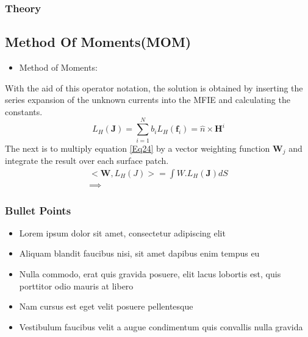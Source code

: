 \documentclass{beamer}
\begin{document}
\begin{frame}
\frametitle{Theory}
\subsection{Method Of Moments(MOM)}
\begin{itemize}
\item Method of Moments:
\end{itemize}
With the aid of this operator notation, the solution is obtained by inserting  the series expansion of the unknown currents into the MFIE and calculating the constants.
\begin{equation}
L_H(\textbf{J}) = \sum_{i=1}^N b_i L_H (\textbf{f}_i) = \hat{n}\times \textbf{H}^i
\label{Eq24}
\end{equation}
The next is to multiply equation \ref{Eq24} by a vector weighting function $\textbf{W}_j$ and integrate the result over each surface patch. 
\begin{eqnarray}
<\textbf{W}, L_H(J)> = \int W.L_H(\textbf{J})dS \\
\implies 
\end{eqnarray}
\end{frame}

\begin{frame}
\frametitle{Bullet Points}
\begin{itemize}
\item Lorem ipsum dolor sit amet, consectetur adipiscing elit
\item Aliquam blandit faucibus nisi, sit amet dapibus enim tempus eu
\item Nulla commodo, erat quis gravida posuere, elit lacus lobortis est, quis porttitor odio mauris at libero
\item Nam cursus est eget velit posuere pellentesque
\item Vestibulum faucibus velit a augue condimentum quis convallis nulla gravida
\end{itemize}
\end{frame}

\end{document}
